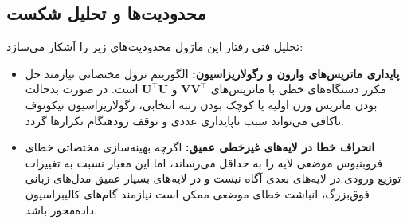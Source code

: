 \subsection{محدودیت‌ها و تحلیل شکست}
تحلیل فنی رفتار این ماژول محدودیت‌های زیر را آشکار می‌سازد:
\begin{itemize}
    \item \textbf{پایداری ماتریس‌های وارون و رگولاریزاسیون:} الگوریتم نزول مختصاتی نیازمند حل مکرر دستگاه‌های خطی با ماتریس‌های $\mathbf{V}\mathbf{V}^\top$ و $\mathbf{U}^\top\mathbf{U}$ است. در صورت بدحالت بودن ماتریس وزن اولیه یا کوچک بودن رتبه انتخابی، رگولاریزاسیون تیکونوف ناکافی می‌تواند سبب ناپایداری عددی و توقف زودهنگام تکرارها گردد.
    \item \textbf{انحراف خطا در لایه‌های غيرخطی عمیق:} اگرچه بهینه‌سازی مختصاتی خطای فروبنیوس موضعی لایه را به حداقل می‌رساند، اما این معیار نسبت به تغییرات توزیع ورودی در لایه‌های بعدی آگاه نیست و در لایه‌های بسیار عمیق مدل‌های زبانی فوق‌بزرگ، انباشت خطای موضعی ممکن است نیازمند گام‌های کالیبراسیون داده‌محور باشد.
\end{itemize}
